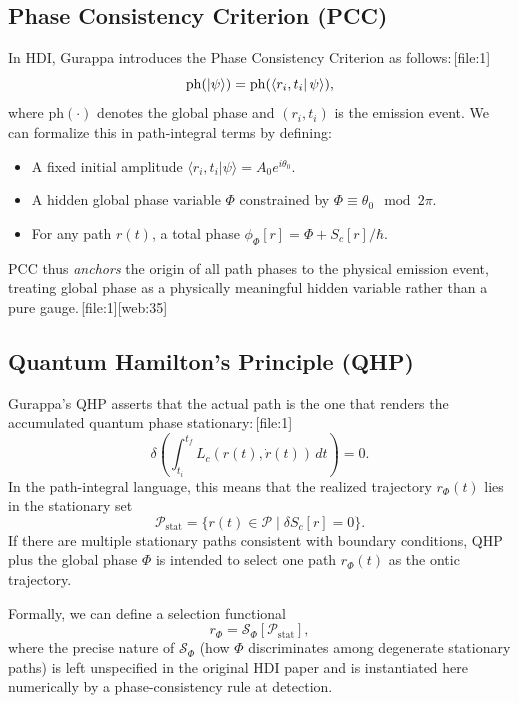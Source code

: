\documentclass[11pt]{article}
\begin{document}
\subsection{Phase Consistency Criterion (PCC)}

In HDI, Gurappa introduces the Phase Consistency Criterion as follows:\,[file:1]
\begin{equation}
\mathrm{ph}(\ket{\psi}) = \mathrm{ph}(\bra{r_i,t_i}\psi\rangle),
\end{equation}
where \(\mathrm{ph}(\cdot)\) denotes the global phase and \((r_i,t_i)\) is the emission event.
We can formalize this in path-integral terms by defining:

\begin{itemize}[leftmargin=*]
  \item A fixed initial amplitude
  \(\langle r_i,t_i|\psi\rangle = A_0 e^{i\theta_0}\).
  \item A hidden global phase variable \(\Phi\) constrained by
  \(\Phi \equiv \theta_0 \mod 2\pi\).
  \item For any path \(r(t)\), a total phase
  \(\phi_\Phi[r] = \Phi + S_c[r]/\hbar\).
\end{itemize}

PCC thus \emph{anchors} the origin of all path phases to the physical emission event, treating global phase as a physically meaningful hidden variable rather than a pure gauge.\,[file:1][web:35]

\subsection{Quantum Hamilton's Principle (QHP)}

Gurappa's QHP asserts that the actual path is the one that renders the accumulated quantum phase stationary:\,[file:1]
\begin{equation}
\delta \left(\int_{t_i}^{t_f} L_c(r(t), \dot r(t))\,dt\right) = 0.\label{eq:QHP}
\end{equation}
In the path-integral language, this means that the realized trajectory \(r_\Phi(t)\) lies in the stationary set
\begin{equation}
\mathcal{P}_{\mathrm{stat}} = \{r(t)\in\mathcal{P}\mid \delta S_c[r]=0\}.
\end{equation}
If there are multiple stationary paths consistent with boundary conditions, QHP plus the global phase \(\Phi\) is intended to select one path \(r_\Phi(t)\) as the ontic trajectory.

Formally, we can define a selection functional
\begin{equation}
r_\Phi = \mathcal{S}_\Phi[\mathcal{P}_{\mathrm{stat}}],
\end{equation}
where the precise nature of \(\mathcal{S}_\Phi\) (how \(\Phi\) discriminates among degenerate stationary paths) is left unspecified in the original HDI paper and is instantiated here numerically by a phase-consistency rule at detection.
\end{document}
